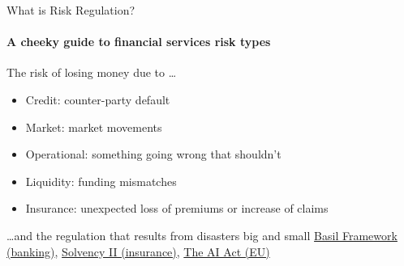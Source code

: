 \begin{frame}{What is Risk Regulation?}
  \framesubtitle{A cheeky guide to financial services risk types}
  \begin{block}{The risk of losing money due to \ldots}
    \begin{itemize}
      \item Credit: counter-party default
      \item Market: market movements
      \item Operational: something going wrong that shouldn't
      \item Liquidity: funding mismatches
      \item Insurance: unexpected loss of premiums or increase of claims
    \end{itemize}
  \end{block}

  \begin{block}{\ldots and the regulation that results from disasters big and small}
    \href{https://www.bis.org/basel_framework/}{Basil Framework (banking)},
    \href{https://www.eiopa.europa.eu/browse/solvency-2_en}{Solvency II (insurance)},
    \href{https://www.europarl.europa.eu/doceo/document/TA-9-2024-0138_EN.html}{The AI Act (EU)}
  \end{block}
\end{frame}


